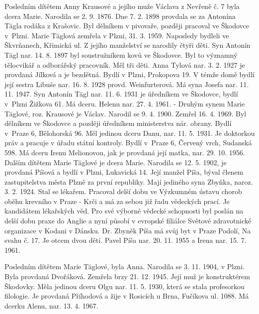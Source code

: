 \documentclass[../dejiny-rodu-prusiku.tex]{subfiles}
\begin{document}
Posledním dítětem Anny Krausové a jejího muže Václava z Nevřeně č. 7 byla dcera Marie. Narodila se 2. 9. 1876. Dne 7. 2. 1898 provdala se za Antonína Tägla rodáka z Krašovic. Byl dělníkem v pivovaře, později pracoval ve Škodovce v Plzni. Marie Täglová zemřela v Plzni, 31. 3. 1959. Naposledy bydleli ve Škvrňanech, Křimická ul. Z jejího manželství se narodily čtyři děti.  Syn Antonín Tägl nar. 14. 8. 1897 byl soustružníkem kovů ve Škodovce. Byl to významný tělocvikář a odborářský pracovník. Měl
tři děti. Anna Tylová nar. 3. 2. 1927 je provdaná Jílková a je bezdětná. Bydlí v Plzni, Prokopova 19. V témže domě bydlí její sestra Libuše nar. 16. 8. 1928 provd. Weinfurterová. Má syna Josefa nar. 11. 11. 1947. Syn Antonín Tägl nar. 11. 6. 1931 je úředníkem ve Škodovce,  bydlí v Plzni Žižkova 61. Má dceru. Helenu nar. 27. 4. 1961. - Druhým synem Marie Täglové, roz. Krauso­vé je Václav. Narodil se 9. 4. 1900. Zemřel 16. 4. 1969. Byl dělníkem ve Škodovce a později úředníkem ministerstva nár. obrany. Bydlí v Praze 6, Bělohorská 96. Měl jedinou dceru Danu, nar. 11. 5. 1931. Je doktorkou práv a pracuje v úřadu státní kontroly. Bydlí v Praze 6, Červený vrch, Sudanská 598. Má dceru Irenu Melionovou, jak je provdaná její matka, nar. 29. 10. 1956. Dalším dítětem Marie Täglové je dcera Marie. Narodila se 12. 5. 1902, je provdaná Píšová a bydlí v Plzni, Lukavická 14. Její manžel Píša, býval členem zastupitelstva města Plzně za první republiky. Mají jediného syna Zbyňka, naroz. 3. 2. 1924. Stal se lékařem. Pracoval delší dobu ve Výzkumném ústavu chorob oběhu krevního v Praze - Krči a má za sebou již řadu vědeckých prací. Je kandidátem lékařských věd. Pro své výborné vědecké schopnosti byl poslán na delší dobu praxe do Anglie a nyní působí v evropské filiálce Svě­tové zdravotnické organizace v Kodani v Dánsku. Dr. Zby­něk Píša má svůj byt v Praze Podolí, Na svahu č. 17. Je otcem dvou dětí. Pavel Píša nar. 20. 11. 1955 a Irena nar. 15. 7. 1961.

Posledním dítětem Marie Täglové, byla Anna. Narodila se 3. 11. 1904, v Plzni. Byla provdaná Dvořáková. Zemře­la brzy 21. 12. 1945. Její muž je konstruktérem Škodovky. Měla jedinou dceru Olgu nar. 11. 5. 1930, která se stala profesorkou filologie. Je provdaná Příhodová a žije v Rosicích u Brna, Fučíkova ul. 1088. Má dcerku Alenu, nar. 13. 4. 1967.
\end{document}
